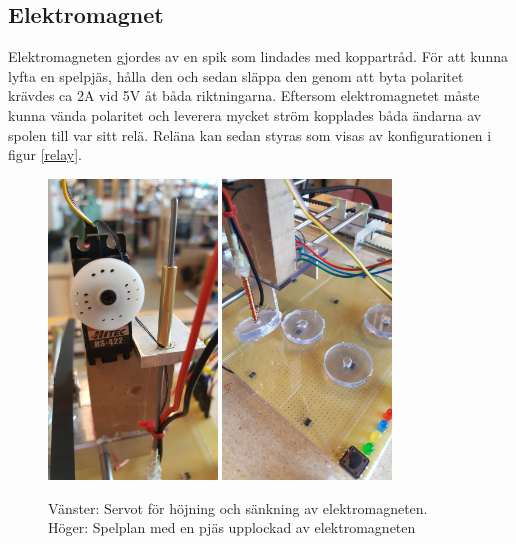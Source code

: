 \documentclass[a4paper]{article}
\begin{document}
\subsection{Elektromagnet}
Elektromagneten gjordes av en spik som lindades med koppartråd.
För att kunna lyfta en spelpjäs, hålla den och sedan släppa den genom att byta polaritet krävdes ca 2A vid 5V åt båda riktningarna.
Eftersom elektromagnetet måste kunna vända polaritet och leverera mycket ström kopplades båda ändarna av spolen till var sitt relä.
Reläna kan sedan styras som visas av konfigurationen i figur \ref{relay}.
\begin{figure}
\centering
\includegraphics[width=0.4\textwidth,keepaspectratio]{../images/servo_fram}
\includegraphics[width=0.4\textwidth,keepaspectratio]{../images/elektromagnet}
\caption{Vänster: Servot för höjning och sänkning av elektromagneten. Höger: Spelplan med en pjäs upplockad av elektromagneten}
\label{servo_fram}
\end{figure}
\end{document}
